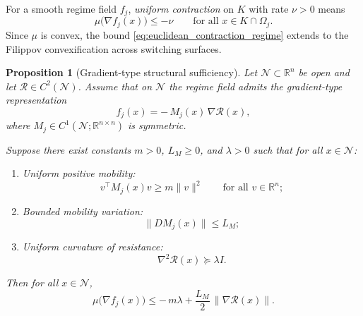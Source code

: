 \documentclass[12pt]{article}
\theoremstyle{plain}
\newtheorem{proposition}[theorem]{Proposition}
\theoremstyle{definition}
\theoremstyle{remark}
\begin{document}
For a smooth regime field $f_j$, \emph{uniform contraction} on $K$ with
rate $\nu>0$ means
\begin{equation}
\mu\!\big(\nabla f_j(x)\big)\le -\nu
\qquad \text{for all } x\in K\cap\Omega_j .
\label{eq:euclidean_contraction_regime}
\end{equation}
Since $\mu$ is convex, the bound \eqref{eq:euclidean_contraction_regime}
extends to the Filippov convexification across switching surfaces.

\begin{proposition}[Gradient-type structural sufficiency]
\label{prop:contraction_sufficient}
Let $\mathcal N\subset\mathbb R^n$ be open and let
$\mathcal R\in C^2(\mathcal N)$.
Assume that on $\mathcal N$ the regime field admits the gradient-type
representation
\begin{equation}
f_j(x) = -\,M_j(x)\,\nabla \mathcal R(x),
\label{eq:gradient_type_dynamics}
\end{equation}
where $M_j\in C^1(\mathcal N;\mathbb R^{n\times n})$ is symmetric.

Suppose there exist constants $m>0$, $L_M\ge0$, and $\lambda>0$ such that
for all $x\in\mathcal N$:
\begin{enumerate}[label=(S\arabic*),leftmargin=2.6em]
\item \emph{Uniform positive mobility:}
\begin{equation}
v^\top M_j(x)v \ge m\|v\|^2
\qquad \text{for all } v\in\mathbb R^n;
\label{eq:mobility_lower_bound_structural}
\end{equation}
\item \emph{Bounded mobility variation:}
\begin{equation}
\|D M_j(x)\|\le L_M;
\label{eq:mobility_lipschitz_structural}
\end{equation}
\item \emph{Uniform curvature of resistance:}
\begin{equation}
\nabla^2\mathcal R(x)\succeq \lambda I.
\label{eq:R_curvature_structural}
\end{equation}
\end{enumerate}
Then for all $x\in\mathcal N$,
\begin{equation}
\mu\!\big(\nabla f_j(x)\big)
\le
-\,m\lambda
+
\frac{L_M}{2}\,\|\nabla\mathcal R(x)\|.
\label{eq:mu_bound_general}
\end{equation}


\end{proposition}
\end{document}
